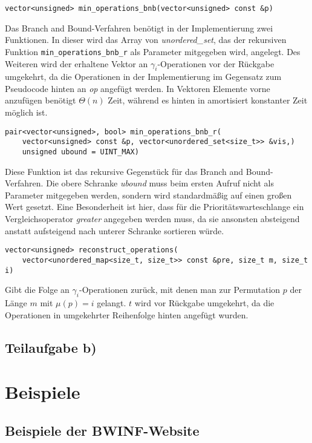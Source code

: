 \documentclass[a4paper, 11pt, ngerman]{article}
\begin{document}
\noindent \verb|vector<unsigned> min_operations_bnb(vector<unsigned> const &p)|
\smallskip

\noindent Das Branch and Bound-Verfahren benötigt in der Implementierung zwei Funktionen. In dieser wird das Array von \emph{unordered\_set}, das der rekursiven Funktion \verb|min_operations_bnb_r| als Parameter mitgegeben wird, angelegt. Des Weiteren wird der erhaltene Vektor an $\gamma_i$-Operationen vor der Rückgabe umgekehrt, da die Operationen in der Implementierung im Gegensatz zum Pseudocode hinten an \emph{op} angefügt werden. In Vektoren Elemente vorne anzufügen benötigt $\Theta(n)$ Zeit, während es hinten in amortisiert konstanter Zeit möglich ist.
\bigskip

\noindent \verb|pair<vector<unsigned>, bool> min_operations_bnb_r(| \\
\verb|    vector<unsigned> const &p, vector<unordered_set<size_t>> &vis,)| \\
\verb|    unsigned ubound = UINT_MAX)|
\smallskip

\noindent Diese Funktion ist das rekursive Gegenstück für das Branch and Bound-Verfahren. Die obere Schranke \emph{ubound} muss beim ersten Aufruf nicht als Parameter mitgegeben werden, sondern wird standardmäßig auf einen großen Wert gesetzt. Eine Besonderheit ist hier, dass für die Prioritätswarteschlange ein Vergleichsoperator \emph{greater} angegeben werden muss, da sie ansonsten absteigend anstatt aufsteigend nach unterer Schranke sortieren würde.
\bigskip

\noindent \verb|vector<unsigned> reconstruct_operations(| \\
\verb|    vector<unordered_map<size_t, size_t>> const &pre, size_t m, size_t i)|
\smallskip

\noindent Gibt die Folge an $\gamma_i$-Operationen zurück, mit denen man zur Permutation $p$ der Länge $m$ mit $\mu(p) = i$ gelangt. $t$ wird vor Rückgabe umgekehrt, da die Operationen in umgekehrter Reihenfolge hinten angefügt wurden.

\subsection{Teilaufgabe b)}

\section{Beispiele}

\subsection{Beispiele der BWINF-Website}
\end{document}
